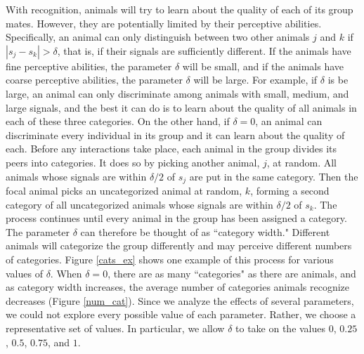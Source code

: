 With recognition, animals will try to learn about the quality of each of its group mates. However, they are potentially limited by their perceptive abilities. Specifically, an animal can only distinguish between two other animals $j$ and $k$ if $|s_j-s_k|>\delta$, that is, if their signals are sufficiently different. If the animals have fine perceptive abilities, the parameter $\delta$ will be small, and if the animals have coarse perceptive abilities, the parameter $\delta$ will be large. For example, if $\delta$ is be large, an animal can only discriminate among animals with small, medium, and large signals, and the best it can do is to learn about the quality of all animals in each of these three categories. On the other hand, if $\delta=0$, an animal can discriminate every individual in its group and it can learn about the quality of each. Before any interactions take place, each animal in the group divides its peers into categories. It does so by picking another animal, $j$, at random. All animals whose signals are within $\delta/2$ of $s_j$ are put in the same category. Then the focal animal picks an uncategorized animal at random, $k$, forming a second category of all uncategorized animals whose signals are within $\delta/2$ of $s_k$. The process continues until every animal in the group has been assigned a category. The parameter $\delta$ can therefore be thought of as ``category width."  Different animals will categorize the group differently and may perceive different numbers of categories. Figure \ref{cats_ex} shows one example of this process for various values of $\delta$. When $\delta=0$, there are as many ``categories" as there are animals, and as category width increases, the average number of categories animals recognize decreases (Figure \ref{num_cat}). Since we analyze the effects of several parameters, we could not explore every possible value of each parameter. Rather, we choose a representative set of values. In particular, we allow $\delta$ to take on the values $0$, $0.25$, $0.5$, $0.75$, and $1$.

